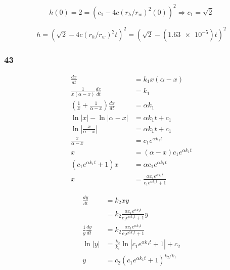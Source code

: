 \documentclass{article}
\begin{document}
\[h(0) = 2 = (c_1 - 4 c (r_h / r_w)^2 (0))^2 \Rightarrow c_1 = \sqrt{2}\]

\[h = (\sqrt{2} - 4 c (r_h / r_w)^2 t)^2 = (\sqrt{2} - (\num{1.63e-5}) t)^2\]

\subsubsection{43}

\begin{align*}
  \frac{dx}{dt}                                                   & = k_1 x (\alpha - x)                                           \\
  \frac{1}{x (\alpha - x)} \frac{dx}{dt}                          & = k_1                                                          \\
  \left( \frac{1}{x} + \frac{1}{\alpha - x} \right) \frac{dx}{dt} & = \alpha k_1                                                   \\
  \ln |x| - \ln |\alpha - x|                                      & = \alpha k_1 t + c_1                                           \\
  \ln \left| \frac{x}{\alpha - x} \right|                         & = \alpha k_1 t + c_1                                           \\
  \frac{x}{\alpha - x}                                            & = c_1 e^{\alpha k_1 t}                                         \\
  x                                                               & = (\alpha - x) c_1 e^{\alpha k_1 t}                            \\
  (c_1 e^{\alpha k_1 t} + 1) x                                    & = \alpha c_1 e^{\alpha k_1 t}                                  \\
  x                                                               & = \frac{\alpha c_1 e^{\alpha k_1 t}}{c_1 e^{\alpha k_1 t} + 1}
\end{align*}

\begin{align*}
  \frac{dy}{dt}             & = k_2 x y                                                            \\
                            & = k_2 \frac{\alpha c_1 e^{\alpha k_1 t}}{c_1 e^{\alpha k_1 t} + 1} y \\
  \frac{1}{y} \frac{dy}{dt} & = k_2 \frac{\alpha c_1 e^{\alpha k_1 t}}{c_1 e^{\alpha k_1 t} + 1}   \\
  \ln |y|                   & = \frac{k_2}{k_1} \ln |c_1 e^{\alpha k_1 t} + 1| + c_2               \\
  y                         & = c_2 (c_1 e^{\alpha k_1 t} + 1)^{k_2 / k_1}
\end{align*}
\end{document}
